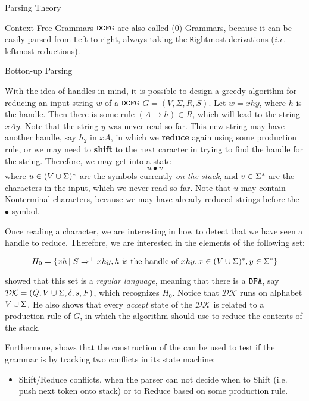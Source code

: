 \begin{section}{Parsing Theory}
\begin{subsection}{Context-Free Grammars}
$\texttt{DCFG}$ are also called (0) Grammars, because it can
be easily parsed from \texttt{L}eft-to-right, always taking the \texttt{R}ightmost
derivations (\textit{i.e.} leftmost reductions).

\end{subsection}
\begin{subsection}{Botton-up Parsing}

With the idea of handles in mind, it is possible to design a greedy algorithm
for reducing an input string $w$ of a $\texttt{DCFG}$ $G = (V, \Sigma, R, S)$. Let $w = xhy$, where $h$ is the
handle. Then there is some rule $\left(A \rightarrow h \right) \in R$, which will lead to the
string $xAy$. Note that the string $y$ was never read so far. This new string
may have another handle, say $h_2$ in $xA$, in which we \textbf{reduce} again
using some production rule, or we may need to \textbf{shift} to the next caracter
in trying to find the handle for the string. Therefore, we may get into a state
$$u \bullet v$$
where $u \in (V \cup \Sigma)^*$ are the symbols currently \textit{on the stack},
and $v \in \Sigma^*$ are the characters in the input, which we never read so far.
Note that $u$ may contain Nonterminal characters, because we may have already
reduced strings before the $\bullet$ symbol.

Once reading a character, we are interesting in how to detect that we have
seen a handle to reduce. Therefore, we are interested in the elements of
the following set:

$$H_0 = \{xh\,|\;S \Rightarrow^+ xhy, h \text{ is the handle of } xhy, x \in (V \cup \Sigma)^*, y \in \Sigma^*\}$$

\cite{knuth1965translation} showed that this set is a \textit{regular language},
meaning that there is a $\texttt{DFA}$, say $\mathcal{DK} = (Q, V \cup \Sigma, \delta, s, F)$, which
recognizes $H_0$. Notice that $\mathcal{DK}$ runs on alphabet $V \cup \Sigma$.
He also shows that every \textit{accept} state of the $\mathcal{DK}$ is related
to a production rule of $G$, in which the algorithm should use to reduce the
contents of the stack.

Furthermore, \cite{sipser2012} shows that the construction of the
\DFA can be used to test if the grammar is \DCFG by tracking two
conflicts in its state machine:

\begin{itemize}
	\item Shift/Reduce conflicts, when the parser can not decide when
	to Shift (i.e. push next token onto stack) or to Reduce based on
	some production rule.


\end{itemize}
\end{subsection}
\end{section}
